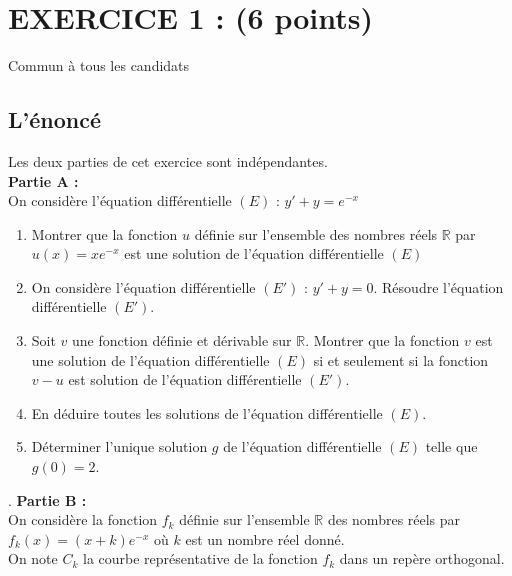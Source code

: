 \documentclass[a4paper,11pt]{book}
\newcommand{\R}{{\mathbb{R}}}
\begin{document}
\section{EXERCICE 1 : (6 points)}
Commun  \`a  tous les candidats
\subsection{L'\'enonc\'e}
Les deux parties de cet exercice sont ind\'ependantes.\\
{\bf Partie A :}\\
On consid\`ere l'\'equation diff\'erentielle $(E)$ : $y'+y=e^{-x}$ 
\begin{enumerate}  
\item Montrer que la fonction $u$ d\'efinie sur l'ensemble des nombres r\'eels 
$\R$ par $u(x)=xe^{-x}$ est une solution de l'\'equation diff\'erentielle $(E)$
\item On consid\`ere l'\'equation diff\'erentielle $(E')$ : $y'+y=0$. 
R\'esoudre l'\'equation diff\'erentielle $(E')$.
\item Soit $v$ une fonction d\'efinie et d\'erivable sur $\R$. Montrer que la 
fonction $v$ est une solution de l'\'equation diff\'erentielle $(E)$ si et 
seulement si la fonction $v-u$ est solution de l'\'equation diff\'erentielle 
$(E')$.
\item En d\'eduire toutes les solutions de l'\'equation diff\'erentielle $(E)$.
\item D\'eterminer l'unique solution $g$ de l'\'equation diff\'erentielle $(E)$
 telle que $g(0)=2$. 
\end{enumerate}    
       .
{\bf Partie B :}\\
On consid\`ere la fonction $f_k$ d\'efinie sur l'ensemble $\R$ des nombres 
r\'eels par $f_k(x)=(x+k)e^{-x}$ o\`u $k$ est un nombre r\'eel donn\'e.\\
On note $C_k$ la courbe repr\'esentative de la fonction $f_k$ dans un rep\`ere 
orthogonal.
\end{document}

